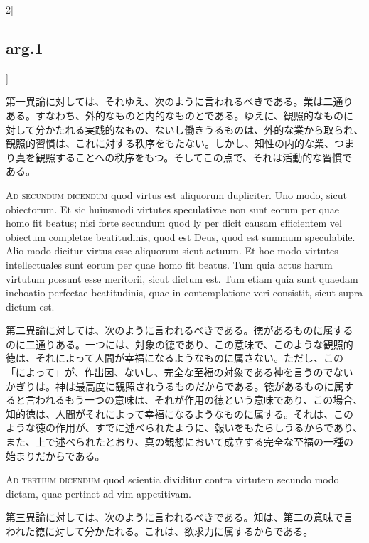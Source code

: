 \documentclass[paper=a4paper,fontsize=10pt,jafontsize=9pt,titlepage]{jlreq}
\begin{document}
\begin{paracol}{2}[\subsection{arg.1}]
\switchcolumn

第一異論に対しては、それゆえ、次のように言われるべきである。業は二通り
ある。すなわち、外的なものと内的なものとである。ゆえに、観照的なものに
対して分かたれる実践的なもの、ないし働きうるものは、外的な業から取られ、
観照的習慣は、これに対する秩序をもたない。しかし、知性の内的な業、つま
り真を観照することへの秩序をもつ。そしてこの点で、それは活動的な習慣で
ある。

\switchcolumn*[\subsection{ad.2}]

{\scshape Ad secundum dicendum} quod virtus est aliquorum
dupliciter. Uno modo, sicut obiectorum. Et sic huiusmodi virtutes
speculativae non sunt eorum per quae homo fit beatus; nisi forte
secundum quod ly per dicit causam efficientem vel obiectum completae
beatitudinis, quod est Deus, quod est summum speculabile. Alio modo
dicitur virtus esse aliquorum sicut actuum. Et hoc modo virtutes
intellectuales sunt eorum per quae homo fit beatus. Tum quia actus
harum virtutum possunt esse meritorii, sicut dictum est. Tum etiam
quia sunt quaedam inchoatio perfectae beatitudinis, quae in
contemplatione veri consistit, sicut supra dictum est.

\switchcolumn

第二異論に対しては、次のように言われるべきである。徳があるものに属する
のに二通りある。一つには、対象の徳であり、この意味で、このような観照的
徳は、それによって人間が幸福になるようなものに属さない。ただし、この
「によって」が、作出因、ないし、完全な至福の対象である神を言うのでない
かぎりは。神は最高度に観照されうるものだからである。徳があるものに属す
ると言われるもう一つの意味は、それが作用の徳という意味であり、この場合、
知的徳は、人間がそれによって幸福になるようなものに属する。それは、この
ような徳の作用が、すでに述べられたように、報いをもたらしうるからであり、
また、上で述べられたとおり、真の観想において成立する完全な至福の一種の
始まりだからである。

\switchcolumn*[\subsection{ad.3}]

{\scshape Ad tertium dicendum} quod scientia dividitur contra virtutem
secundo modo dictam, quae pertinet ad vim appetitivam.

\switchcolumn

第三異論に対しては、次のように言われるべきである。知は、第二の意味で言
われた徳に対して分かたれる。これは、欲求力に属するからである。

\end{paracol}
\newpage
\end{document}
